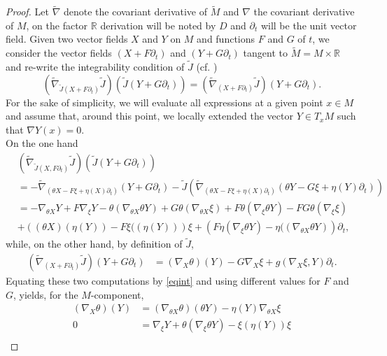 \documentclass[a4paper,reqno]{amsart}
\theoremstyle{definition}
\theoremstyle{remark}
\theoremstyle{plain}
\numberwithin{equation}{section}
\newcommand{\rn}{\mathbb R}
\newcommand{\tJ}{\tilde{J}}
\begin{document}
\begin{proof} 
  Let $\tilde{\nabla}$ denote the covariant derivative of
  $\tilde{M}$ and $\nabla$ the covariant derivative of $M$, on
  the factor $\rn$ derivation will be noted by $D$ and
  $\partial_t$ will be the unit vector field. Given two vector fields
  $X$ and $Y$ on $M$ and functions $F$ and $G$ of $t$, we
  consider the vector fields $(X+F\partial_t)$ and $(Y+G\partial_t)$
  tangent to $\tilde{M}=M\times \mathbb{R}$ and re-write the
  integrability condition of $\tJ$
  (cf. \cite[Prop. 7.1.3]{Baird-Wood})
\begin{equation}\label{eqint}
(\tilde{\nabla}_{\tJ(X+F\partial_t)} \tJ) (\tJ(Y+G\partial_t)) =(\tilde{\nabla}_{(X+F\partial_t)} \tJ) (Y+G\partial_t) .
\end{equation}
For the sake of simplicity, we will evaluate all expressions at a
given point $x\in M$ and assume that, around this point, we
locally extended the vector $Y\in T_{x}M$ such that $\nabla
Y(x)=0$.\\ 
On the one hand
\begin{align*}
&\left(\tilde{\nabla}_{\tJ(X,F\partial_t)} \tJ \right) \left(\tJ(Y+G\partial_t)\right)  \\
&= -\tilde{\nabla}_{(\theta X- F\xi+\eta (X)\partial_t)}(Y+G\partial_t) - \tJ (\tilde{\nabla}_{(\theta X- F\xi+\eta (X)\partial_t)}
(\theta Y - G\xi + \eta (Y) \partial_t) )\\
 &= -\nabla_{\theta X}Y + F \nabla_{\xi}Y -\theta(\nabla_{\theta X}\theta Y)+ G \theta(\nabla_{\theta X}\xi)+ F \theta(\nabla_{\xi}\theta Y)-F G \theta(\nabla_{\xi}\xi)\\
&+\left((\theta X)(\eta(Y))-F \xi((\eta(Y))\right)\xi
+\left(F \eta(\nabla_{\xi}\theta Y)- \eta((\nabla_{\theta X}\theta Y) \right)\partial_t,
\end{align*}
while, on the other hand, by definition of $\tJ$,
\begin{align*}
(\tilde{\nabla}_{(X+F\partial_t)} \tJ) (Y+G\partial_t) &= (\nabla_X \theta) (Y) - G \nabla_{X}\xi +g( \nabla_X\xi, Y) \partial_t.
\end{align*}
Equating these two computations by \eqref{eqint} and using
different values for $F$ and $G$, yields, for the $M$-component, 
\begin{align} 
(\nabla_X \theta) (Y) &= (\nabla_{\theta X} \theta) (\theta Y) - \eta(Y)\nabla_{\theta X} \xi \label{eqa1}\\
0&= \nabla_{\xi}Y+\theta(\nabla_{\xi}\theta Y)-\xi(\eta(Y))\xi
\label{eqa2}\\

\end{align}
\end{proof}
\end{document}
